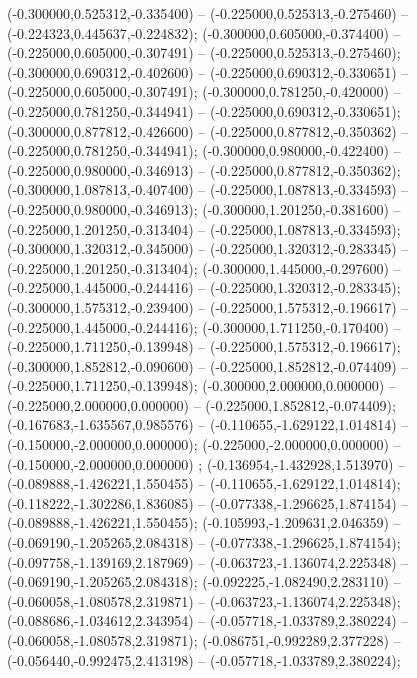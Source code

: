  (-0.300000,0.525312,-0.335400) -- (-0.225000,0.525313,-0.275460) -- (-0.224323,0.445637,-0.224832);
 (-0.300000,0.605000,-0.374400) -- (-0.225000,0.605000,-0.307491) -- (-0.225000,0.525313,-0.275460);
 (-0.300000,0.690312,-0.402600) -- (-0.225000,0.690312,-0.330651) -- (-0.225000,0.605000,-0.307491);
 (-0.300000,0.781250,-0.420000) -- (-0.225000,0.781250,-0.344941) -- (-0.225000,0.690312,-0.330651);
 (-0.300000,0.877812,-0.426600) -- (-0.225000,0.877812,-0.350362) -- (-0.225000,0.781250,-0.344941);
 (-0.300000,0.980000,-0.422400) -- (-0.225000,0.980000,-0.346913) -- (-0.225000,0.877812,-0.350362);
 (-0.300000,1.087813,-0.407400) -- (-0.225000,1.087813,-0.334593) -- (-0.225000,0.980000,-0.346913);
 (-0.300000,1.201250,-0.381600) -- (-0.225000,1.201250,-0.313404) -- (-0.225000,1.087813,-0.334593);
 (-0.300000,1.320312,-0.345000) -- (-0.225000,1.320312,-0.283345) -- (-0.225000,1.201250,-0.313404);
 (-0.300000,1.445000,-0.297600) -- (-0.225000,1.445000,-0.244416) -- (-0.225000,1.320312,-0.283345);
 (-0.300000,1.575312,-0.239400) -- (-0.225000,1.575312,-0.196617) -- (-0.225000,1.445000,-0.244416);
 (-0.300000,1.711250,-0.170400) -- (-0.225000,1.711250,-0.139948) -- (-0.225000,1.575312,-0.196617);
 (-0.300000,1.852812,-0.090600) -- (-0.225000,1.852812,-0.074409) -- (-0.225000,1.711250,-0.139948);
 (-0.300000,2.000000,0.000000) -- (-0.225000,2.000000,0.000000) -- (-0.225000,1.852812,-0.074409);
 (-0.167683,-1.635567,0.985576) -- (-0.110655,-1.629122,1.014814) -- (-0.150000,-2.000000,0.000000);
 (-0.225000,-2.000000,0.000000) -- (-0.150000,-2.000000,0.000000) ;
 (-0.136954,-1.432928,1.513970) -- (-0.089888,-1.426221,1.550455) -- (-0.110655,-1.629122,1.014814);
 (-0.118222,-1.302286,1.836085) -- (-0.077338,-1.296625,1.874154) -- (-0.089888,-1.426221,1.550455);
 (-0.105993,-1.209631,2.046359) -- (-0.069190,-1.205265,2.084318) -- (-0.077338,-1.296625,1.874154);
 (-0.097758,-1.139169,2.187969) -- (-0.063723,-1.136074,2.225348) -- (-0.069190,-1.205265,2.084318);
 (-0.092225,-1.082490,2.283110) -- (-0.060058,-1.080578,2.319871) -- (-0.063723,-1.136074,2.225348);
 (-0.088686,-1.034612,2.343954) -- (-0.057718,-1.033789,2.380224) -- (-0.060058,-1.080578,2.319871);
 (-0.086751,-0.992289,2.377228) -- (-0.056440,-0.992475,2.413198) -- (-0.057718,-1.033789,2.380224);
